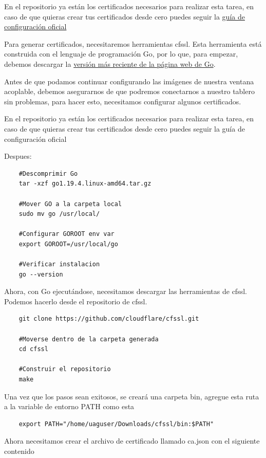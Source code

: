 En el repositorio ya están los certificados necesarios para realizar esta tarea, en caso de que
quieras crear tus certificados desde cero puedes seguir la
\href{https://www.thethingsindustries.com/docs/getting-started/installation/certificates/}{guía de
configuración oficial}

Para generar certificados, necesitaremos herramientas cfssl. Esta herramienta está construida con el
lenguaje de programación Go, por lo que, para empezar, debemos descargar la
\href{https://go.dev/dl/}{versión más reciente de la página web de Go}.

Antes de que podamos continuar configurando las imágenes de nuestra ventana acoplable, debemos
asegurarnos de que podremos conectarnos a nuestro tablero sin problemas, para hacer esto,
necesitamos configurar algunos certificados.

En el repositorio ya están los certificados necesarios para realizar esta tarea, en caso de que
quieras crear tus certificados desde cero puedes seguir la guía de configuración oficial

Despues:

\begin{lstlisting}
    #Descomprimir Go
    tar -xzf go1.19.4.linux-amd64.tar.gz

    #Mover GO a la carpeta local
    sudo mv go /usr/local/

    #Configurar GOROOT env var
    export GOROOT=/usr/local/go

    #Verificar instalacion
    go --version
\end{lstlisting}

Ahora, con Go ejecutándose, necesitamos descargar las herramientas de cfssl. Podemos hacerlo desde
el repositorio de cfssl.

\begin{lstlisting}
    git clone https://github.com/cloudflare/cfssl.git

    #Moverse dentro de la carpeta generada
    cd cfssl

    #Construir el repositorio
    make
\end{lstlisting}

Una vez que los pasos sean exitosos, se creará una carpeta bin, agregue esta ruta a la variable de
entorno PATH como esta

\begin{lstlisting}
    export PATH="/home/uaguser/Downloads/cfssl/bin:$PATH"
\end{lstlisting}

Ahora necesitamos crear el archivo de certificado llamado ca.json con el siguiente contenido

